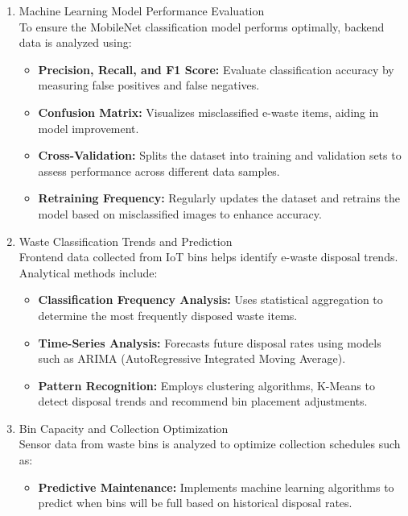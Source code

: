\begin{enumerate}
	\item Machine Learning Model Performance Evaluation \\
To ensure the MobileNet classification model performs optimally, backend data is analyzed using:
	\begin{itemize}
		\item \textbf{Precision, Recall, and F1 Score:} Evaluate classification accuracy by measuring false positives and false negatives.
		\item \textbf{Confusion Matrix:} Visualizes misclassified e-waste items, aiding in model improvement.
		\item \textbf{Cross-Validation:} Splits the dataset into training and validation sets to assess performance across different data samples.
		\item \textbf{Retraining Frequency:} Regularly updates the dataset and retrains the model based on misclassified images to enhance accuracy.
	\end{itemize}
	\item Waste Classification Trends and Prediction \\
Frontend data collected from IoT bins helps identify e-waste disposal trends. Analytical methods include:
	\begin{itemize}
		\item \textbf{Classification Frequency Analysis:} Uses statistical aggregation to determine the most frequently disposed waste items.
		\item \textbf{Time-Series Analysis:} Forecasts future disposal rates using models such as ARIMA (AutoRegressive Integrated Moving Average).
		\item \textbf{Pattern Recognition:} Employs clustering algorithms,  K-Means to detect disposal trends and recommend bin placement adjustments.
	\end{itemize}
	\item Bin Capacity and Collection Optimization \\
Sensor data from waste bins is analyzed to optimize collection schedules such as:
	\begin{itemize}
		\item \textbf{Predictive Maintenance:} Implements machine learning algorithms to predict when bins will be full based on historical disposal rates.
	\end{itemize}
\end{enumerate}

\ifFinished
\else

